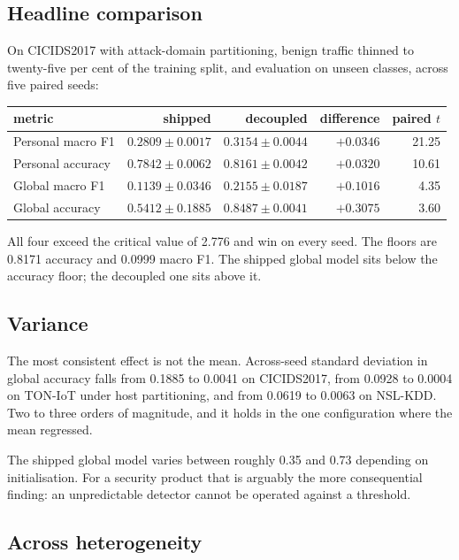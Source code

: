 \subsection{Headline comparison}

On CICIDS2017 with attack-domain partitioning, benign traffic thinned to
twenty-five per cent of the training split, and evaluation on unseen classes,
across five paired seeds:

\begin{center}
\begin{tabular}{lrrrr}
\toprule
metric & shipped & decoupled & difference & paired $t$ \\
\midrule
Personal macro F1 & $0.2809 \pm 0.0017$ & $0.3154 \pm 0.0044$ & $+0.0346$ & 21.25 \\
Personal accuracy & $0.7842 \pm 0.0062$ & $0.8161 \pm 0.0042$ & $+0.0320$ & 10.61 \\
Global macro F1 & $0.1139 \pm 0.0346$ & $0.2155 \pm 0.0187$ & $+0.1016$ & 4.35 \\
Global accuracy & $0.5412 \pm 0.1885$ & $0.8487 \pm 0.0041$ & $+0.3075$ & 3.60 \\
\bottomrule
\end{tabular}
\end{center}

All four exceed the critical value of 2.776 and win on every seed. The floors
are 0.8171 accuracy and 0.0999 macro F1. The shipped global model sits below the
accuracy floor; the decoupled one sits above it.

\subsection{Variance}

The most consistent effect is not the mean. Across-seed standard deviation in
global accuracy falls from 0.1885 to 0.0041 on CICIDS2017, from 0.0928 to 0.0004
on TON-IoT under host partitioning, and from 0.0619 to 0.0063 on NSL-KDD. Two to
three orders of magnitude, and it holds in the one configuration where the mean
regressed.

The shipped global model varies between roughly 0.35 and 0.73 depending on
initialisation. For a security product that is arguably the more consequential
finding: an unpredictable detector cannot be operated against a threshold.

\subsection{Across heterogeneity}

